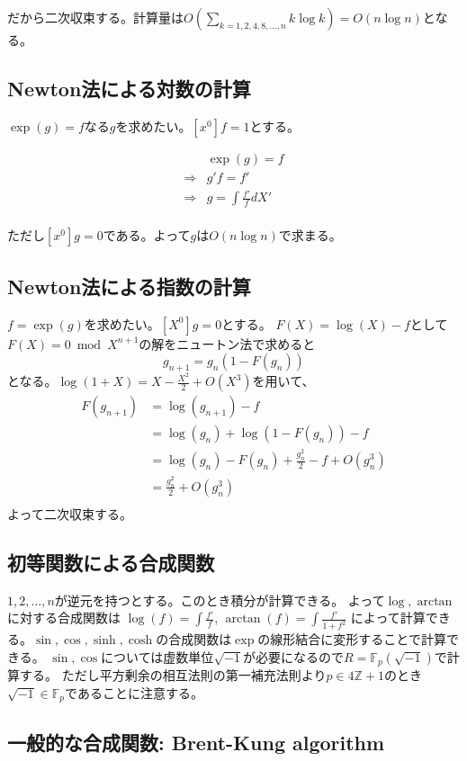 \documentclass{jsarticle}
\begin{document}
だから二次収束する。計算量は$O(\sum_{k=1,2,4,8,\ldots,n}k\log k)=O(n\log n)$となる。

\subsection{Newton法による対数の計算}

$\exp(g)=f$なる$g$を求めたい。$[x^0]f=1$とする。


\begin{align}
  &\exp(g)=f\\
  \Rightarrow&g'f=f'\\
  \Rightarrow&g=\int \frac{f'}{f} dX'\\
\end{align}

ただし$[x^0]g=0$である。よって$g$は$O(n \log n)$で求まる。

\subsection{Newton法による指数の計算}

$f=\exp(g) $を求めたい。$[X^0]g=0$とする。
$F(X)=\log(X)-f$として$F(X)=0\bmod X^{n+1}$の解をニュートン法で求めると
$$g_{n+1}=g_n(1-F(g_n))$$
となる。$\log(1+X)=X-\frac{X^2}{2}+O(X^3)$を用いて、
\begin{align}
  F(g_{n+1})&=\log(g_{n+1})-f\\
  &=\log(g_{n})+\log(1-F(g_n))-f\\
  &=\log(g_{n})-F(g_n)+\frac{g_n^2}{2}-f+O(g_n^3)\\
  &=\frac{g_n^2}{2}+O(g_n^3)\\
\end{align}
よって二次収束する。

\subsection{初等関数による合成関数}

$1,2,\ldots,n$が逆元を持つとする。このとき積分が計算できる。
よって$\log,\arctan$に対する合成関数は
$\log(f)=\int \frac{f'}{f}$, $\arctan(f)=\int \frac{f'}{1+f^2}$
によって計算できる。$\sin,\cos,\sinh,\cosh$の合成関数は$\exp$の線形結合に変形することで計算できる。
$\sin,\cos$については虚数単位$\sqrt{-1}$が必要になるので$R=\mathbb{F}_p(\sqrt{-1})$で計算する。
ただし平方剰余の相互法則の第一補充法則より$p\in 4\mathbb{Z}+1$のとき$\sqrt{-1}\in\mathbb{F}_p$であることに注意する。


\subsection{一般的な合成関数: Brent-Kung algorithm}
\end{document}
